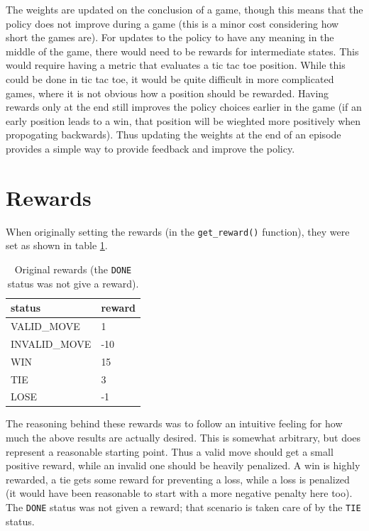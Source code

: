 \documentclass{article}
\renewcommand{\arraystretch}{1.25}
\begin{document}
   The weights are updated on the conclusion of a game, though this means that the policy does not improve
   during a game (this is a minor cost considering how short the games are). For updates to the policy to have
   any meaning in the middle of the game, there would need to be rewards for intermediate states. This would
   require having a metric that evaluates a tic tac toe position. While this could be done in tic tac toe,
   it would be quite difficult in more complicated games, where it is not obvious how a position should be
   rewarded. Having rewards only at the end still improves the policy choices earlier in the game (if an early
   position leads to a win, that position will be wieghted more positively when propogating backwards).
   Thus updating the weights at the end of an episode provides a simple way to provide feedback and improve the
   policy.

   \section{Rewards}
   When originally setting the rewards (in the \texttt{get\_reward()} function), they were set as shown in
   table \ref{table:part4}.
      \begin{table}[h]
         \centering
         \renewcommand{\arraystretch}{1.5}

         \begin{tabular}{ p{8em}|l }
            \hline
            status     &     reward      \\
            \hline \hline
            VALID\_MOVE       &  1       \\
            INVALID\_MOVE     &  -10     \\
            WIN               &  15      \\
            TIE               &  3       \\
            LOSE              &  -1      \\
            \hline
         \end{tabular}

         \caption{ Original rewards (the \texttt{DONE} status was not give a reward). }
         \label{table:part4}
      \end{table}
   The reasoning behind these rewards was to follow an intuitive feeling for how much the above results
   are actually desired. This is somewhat arbitrary, but does represent a reasonable starting point.
   Thus a valid move should get a small positive reward, while an invalid one should
   be heavily penalized. A win is highly rewarded, a tie gets some reward for preventing a loss, while a
   loss is penalized (it would have been reasonable to start with a more negative penalty here too).
   The \texttt{DONE} status was not given a reward; that scenario is taken care of by the \texttt{TIE} status.
\end{document}
